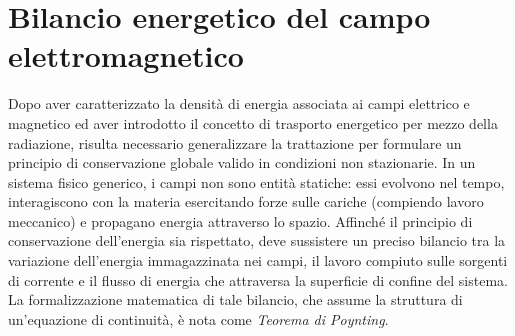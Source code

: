 \documentclass[a4paper,11pt]{report}
\begin{document}
\section{Bilancio energetico del campo elettromagnetico}
Dopo aver caratterizzato la densità di energia associata ai campi elettrico e magnetico ed aver introdotto il concetto di trasporto energetico per mezzo della radiazione, risulta necessario generalizzare la trattazione per formulare un principio di conservazione globale valido in condizioni non stazionarie.
In un sistema fisico generico, i campi non sono entità statiche: essi evolvono nel tempo, interagiscono con la materia esercitando forze sulle cariche (compiendo lavoro meccanico) e propagano energia attraverso lo spazio. Affinché il principio di conservazione dell'energia sia rispettato, deve sussistere un preciso bilancio tra la variazione dell'energia immagazzinata nei campi, il lavoro compiuto sulle sorgenti di corrente e il flusso di energia che attraversa la superficie di confine del sistema.
La formalizzazione matematica di tale bilancio, che assume la struttura di un'equazione di continuità, è nota come \textit{Teorema di Poynting}.
\end{document}
